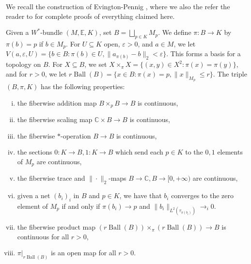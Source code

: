 \documentclass[10pt]{amsart}
\theoremstyle{definition}
\numberwithin{equation}{section}
\newcommand{\bC}{{\mathbb C}}
\newcommand{\bE}{{\mathbb E}}
\DeclareMathOperator{\Ball}{Ball}
\begin{document}
We recall the construction of Evington-Pennig \cite{EPBundles}, where we also the refer the reader to for complete proofs of everything claimed here.

Given a $W^{*}$-bundle $(M,\bE,K)$, set $B=\bigsqcup_{p\in K}M_{p}$. We define $\pi\colon  B\to K$ by $\pi(b)=p$ if $b\in M_{p}$. For $U\subseteq K$ open, $\varepsilon>0$, and $a\in M$, we let $V(a,\varepsilon,U)=\{b\in B:\pi(b)\in U, \|a_{\pi(b)}-b\|_{2}<\varepsilon\}$. This forms a basis for a topology on $B$. For $X\subseteq B$, we set 
$X\times_{\pi}X=\{(x,y)\in X^{2}:\pi(x)=\pi(y)\}$, and for $r>0$, we let $r\Ball(B)=\{x\in B:\pi(x)=p, \|x\|_{M_{p}}\leq r\}$.
The triple $(B,\pi,K)$ has the following properties:
\begin{enumerate}[(i)]
    \item the fiberwise addition map $B\times_{p}B\to B$ is continuous,
    \item the fiberwise scaling map $\bC\times B\to B$ is continuous,
    \item the fiberwise $*$-operation $B\to B$ is continuous,
    \item the sections $0\colon K\to B,1\colon K\to B$ which send each $p\in K$ to the $0,1$ elements of $M_{p}$ are continuous,
    \item the fiberwise trace and $\|\cdot\|_{2}$-maps $B\to \bC,B\to [0,+\infty)$ are continuous,
    \item given a net $(b_{i})_{i}$ in $B$ and $p\in K$, we have that $b_{i}$ converges to the zero element of $M_{p}$ if and only if $\pi(b_{i})\to p$ and $\|b_{i}\|_{L^{2}(\tau_{\pi(b_{i})})}\to_{i}0$.
    \item the fiberwise product map $(r\Ball(B))\times_{\pi}(r\Ball(B))\to B$ is continuous for all $r>0$,
    \item $\pi|_{r\Ball(B)}$ is an open map for all $r>0$. 
\end{enumerate}
\end{document}
